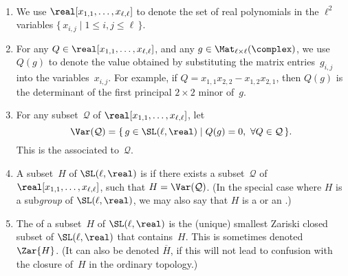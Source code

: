 \begin{defns} \  \label{AlgicGrpDefn}
 \noprelistbreak 
 \begin{enumerate}
 \item We use $\real[x_{1,1}, \ldots, x_{\ell,\ell}]$ to
denote the set of real polynomials in the $\ell^2$ variables
$\{\, x_{i,j} \mid 1 \le i,j \le \ell\, \}$. 
 \item For any $Q \in \real[x_{1,1}, \ldots, x_{\ell,\ell}]$,
and any $g \in \Mat_{\ell\times \ell}(\complex)$, we use
$Q(g)$ to denote the value obtained by substituting the
matrix entries~$g_{i,j}$ into the variables~$x_{i,j}$. For
example, if $Q= x_{1,1} x_{2,2} - x_{1,2} x_{2,1}$, then
$Q(g)$ is the determinant of the first principal $2 \times
2$ minor of~$g$.
 \item For any subset~$\mathcal{Q}$ of
$\real[x_{1,1}, \ldots, x_{\ell,\ell}]$, let
  $$\Var(\mathcal{Q}) = \{\, g \in \SL(\ell,\real) \mid
Q(g) = 0, \ \forall Q \in \mathcal{Q} \,\} .$$
 This is the  associated to~$\mathcal{Q}$.
 \item A subset~$H$ of $\SL(\ell,\real)$ is  if there exists a subset~$\mathcal{Q}$ of $\real[x_{1,1}, \ldots,
x_{\ell,\ell}]$, such that $H = \Var(\mathcal{Q})$. (In the
special case where $H$ is a sub\emph{group} of
$\SL(\ell,\real)$, we may also say that $H$ is a  or an 
.)
 \item The  of a subset~$H$ of
$\SL(\ell,\real)$ is the (unique) smallest Zariski closed
subset of $\SL(\ell,\real)$ that contains~$H$. This is sometimes denoted~%
	$\Zar{H}$.
(It can also be denoted $\overline{H}$, if this will not lead to confusion with the closure of~$H$ in the ordinary topology.)
 \end{enumerate}
 \end{defns}

